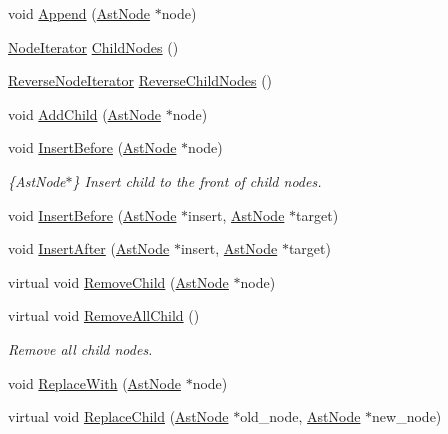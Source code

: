 \begin{DoxyCompactItemize}
\item 
void \hyperlink{classmocha_1_1_ast_node_a5d0f73e95dd7c112d8bef47b94bf9c74}{Append} (\hyperlink{classmocha_1_1_ast_node}{AstNode} $\ast$node)
\item 
\hyperlink{classmocha_1_1_node_iterator}{NodeIterator} \hyperlink{classmocha_1_1_ast_node_a3c769907079ab97a2970d6b54d137ab0}{ChildNodes} ()
\item 
\hyperlink{classmocha_1_1_reverse_node_iterator}{ReverseNodeIterator} \hyperlink{classmocha_1_1_ast_node_a3a4cee9c25492547a645651191a5ac1c}{ReverseChildNodes} ()
\item 
void \hyperlink{classmocha_1_1_ast_node_acada63e4d868960a7fbd972f3d3a0ae4}{AddChild} (\hyperlink{classmocha_1_1_ast_node}{AstNode} $\ast$node)
\item 
void \hyperlink{classmocha_1_1_ast_node_ad30c1ecd04dcdc1e122563ad5aed27e6}{InsertBefore} (\hyperlink{classmocha_1_1_ast_node}{AstNode} $\ast$node)
\begin{DoxyCompactList}\small\item\em \{AstNode$\ast$\} Insert child to the front of child nodes. \end{DoxyCompactList}\item 
void \hyperlink{classmocha_1_1_ast_node_a68881486f02668b77571778ad4877ea5}{InsertBefore} (\hyperlink{classmocha_1_1_ast_node}{AstNode} $\ast$insert, \hyperlink{classmocha_1_1_ast_node}{AstNode} $\ast$target)
\item 
void \hyperlink{classmocha_1_1_ast_node_a3a497322f5e2f8d5c186f38802c18f27}{InsertAfter} (\hyperlink{classmocha_1_1_ast_node}{AstNode} $\ast$insert, \hyperlink{classmocha_1_1_ast_node}{AstNode} $\ast$target)
\item 
virtual void \hyperlink{classmocha_1_1_ast_node_aa41e4e311ebbde8f16905515c0192a33}{RemoveChild} (\hyperlink{classmocha_1_1_ast_node}{AstNode} $\ast$node)
\item 
virtual void \hyperlink{classmocha_1_1_ast_node_ababb12c547452f11a13727491d0a9f4b}{RemoveAllChild} ()
\begin{DoxyCompactList}\small\item\em Remove all child nodes. \end{DoxyCompactList}\item 
void \hyperlink{classmocha_1_1_ast_node_aa8c5bb0152ee6d92471fef102fa4acc1}{ReplaceWith} (\hyperlink{classmocha_1_1_ast_node}{AstNode} $\ast$node)
\item 
virtual void \hyperlink{classmocha_1_1_ast_node_aa40396040f75fb59e320d81c3fd328c8}{ReplaceChild} (\hyperlink{classmocha_1_1_ast_node}{AstNode} $\ast$old\_\-node, \hyperlink{classmocha_1_1_ast_node}{AstNode} $\ast$new\_\-node)

\end{DoxyCompactItemize}
